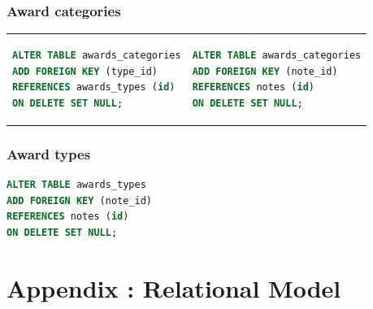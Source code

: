 \documentclass[doubleside, titlepage]{article}
\begin{document}
\subsubsection{Award categories}

\begin{tabular}{ ll }
\begin{minipage}{3in}
\begin{lstlisting}[language=SQL,showspaces=false,basicstyle=\ttfamily,numberstyle=\tiny,commentstyle=\color{gray}
        ]
ALTER TABLE awards_categories
ADD FOREIGN KEY (type_id)
REFERENCES awards_types (id)
ON DELETE SET NULL;
\end{lstlisting}
\end{minipage}
 &
\begin{minipage}{3in}
\begin{lstlisting}[language=SQL,showspaces=false,basicstyle=\ttfamily,numberstyle=\tiny,commentstyle=\color{gray}
        ]
ALTER TABLE awards_categories
ADD FOREIGN KEY (note_id)
REFERENCES notes (id)
ON DELETE SET NULL;
\end{lstlisting}
\end{minipage}
\end{tabular}

\subsubsection{Award types}
\begin{lstlisting}[language=SQL,showspaces=false,basicstyle=\ttfamily,numberstyle=\tiny,commentstyle=\color{gray}
        ]
ALTER TABLE awards_types
ADD FOREIGN KEY (note_id)
REFERENCES notes (id)
ON DELETE SET NULL;
\end{lstlisting}

\section{Appendix : Relational Model}
\end{document}

